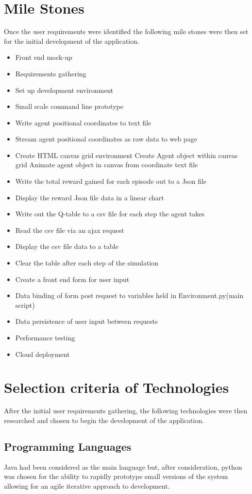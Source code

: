\section{Mile Stones}
Once the user requirements were identified the following mile stones were then set for the initial development of the application.
\begin{itemize}
	\item Front end mock-up
	\item Requirements gathering
	\item Set up development environment
	\item Small scale command line prototype
	\item Write agent positional coordinates to text file
	\item Stream agent positional coordinates as raw data to web page
	\item Create HTML canvas grid environment
	\subitem Create Agent object within canvas grid
	\subitem Animate agent object in canvas from coordinate text file
	\item Write the total reward gained for each episode out to a Json file
	\item Display the reward Json file data in a linear chart
	\item Write out the Q-table to a csv file for each step the agent takes
	\item Read the csv file via an ajax request
	\item Display the csv file data to a table 
	\item Clear the table after each step of the simulation
	\item Create a front end form for user input
	\item Data binding of form post request to variables held in Environment.py(main script)
	\item Data persistence of user input between requests
	\item Performance testing
	\item Cloud deployment
\end{itemize}
\section{Selection criteria of Technologies}
After the initial user requirements gathering, the following technologies were then researched and chosen to begin the development of the application.

\subsection{Programming Languages}
Java had been considered as the main language but, after consideration, python was chosen for the ability to rapidly prototype small versions of the system allowing for an agile iterative approach to development.

